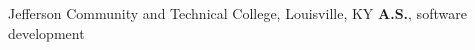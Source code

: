 {%
	Jefferson Community and Technical College, Louisville, KY}
{%
	\textbf{A.S.}, software development}
{}
